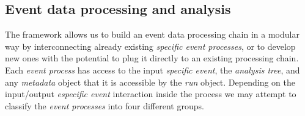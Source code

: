
\subsection{Event data processing and analysis}

The framework allows us to build an event data processing chain in a modular way by interconnecting already existing \emph{specific event processes}, or to develop new ones with the potential to plug it directly to an existing processing chain. Each \emph{event process} has access to the input \emph{specific event}, the \emph{analysis tree}, and any \emph{metadata} object that it is accessible by the \emph{run} object. Depending on the input/output \emph{especific event} interaction inside the process we may attempt to classify the \emph{event processes} into four different groups.

